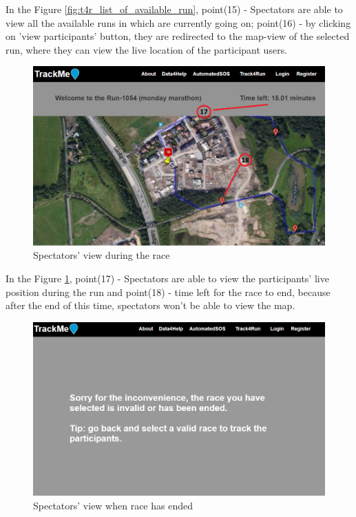 \documentclass[a4paper, hidelinks, 12pt]{report}
\begin{document}
	In the Figure \ref{fig:t4r_list_of_available_run}, point(15) - Spectators are able to view all the available runs in which are currently going on; point(16) - by clicking on 'view participants' button, they are redirected to the map-view of the selected run, where they can view the live location of the participant users. 
	
	\begin{figure}[H]
		\centering
		\includegraphics[width=1\textwidth]{../Assets/spectators_valid_race.png}\caption[UI: Spectators' view during the race]{Spectators' view during the race}
		\label{fig:spectators_valid_race}
	\end{figure}
	
	In the Figure \ref{fig:spectators_valid_race}, point(17) - Spectators are able to view  the participants' live position during the run and point(18) - time left for the race to end, because after the end of this time, spectators won't be able to view the map. 
	
	\begin{figure}[H]
		\centering
		\includegraphics[width=1\textwidth]{../Assets/spectators_invalid_race.png}\caption[UI: Spectators' view when race has ended]{Spectators' view when race has ended}
		\label{fig:spectators_invalid_race}
	\end{figure}
	
\end{document}
